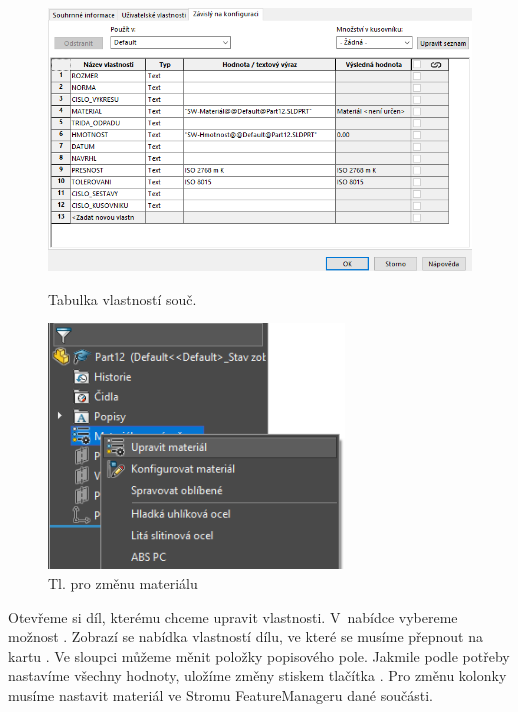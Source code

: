 \begin{figure}[htbp]
    \centering
    \begin{minipage}[b]{0.45\textwidth}
        \centering
        \includegraphics[width=1\textwidth]{img/030 img/vlastnosti-dilu.png}
        \caption{Tabulka vlastností souč.}
        \label{fig:realview-1}
    \end{minipage}
    \qquad
    \begin{minipage}[b]{0.45\textwidth}
        \centering
        \includegraphics[width=0.7\textwidth]{img/030 img/upravit-material.png}
        \caption{Tl. pro změnu materiálu}
        \label{fig:realview-2}
    \end{minipage}
\end{figure}

Otevřeme si díl, kterému chceme upravit vlastnosti.
V~nabídce  vybereme možnost .
Zobrazí se nabídka vlastností dílu, ve které se musíme přepnout na kartu .
Ve sloupci  můžeme měnit položky popisového pole.
Jakmile podle potřeby nastavíme všechny hodnoty, uložíme změny stiskem tlačítka .
Pro změnu kolonky  musíme nastavit materiál ve Stromu FeatureManageru dané součásti.

